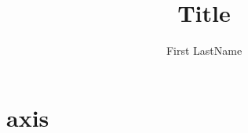 \documentclass{article}
\title{Title}
\author{First LastName}
\begin{document}
\section{axis}
\end{document}
